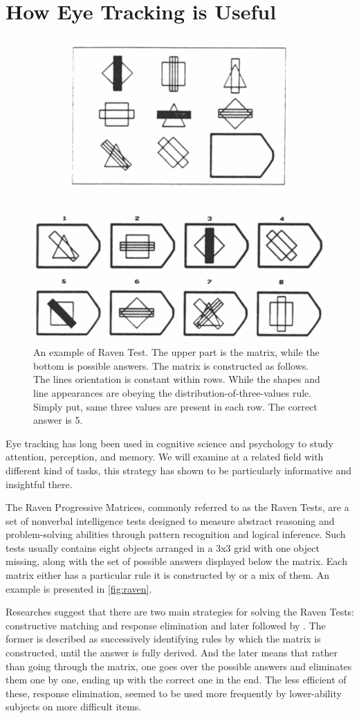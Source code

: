 \section{How Eye Tracking is Useful}
\begin{figure}
    \centering
    \includegraphics[width=0.5\linewidth]{images/raven_carpenter_1990.png}
    \caption{An example of Raven Test. The upper part is the matrix, while the bottom is possible answers. The matrix is constructed as follows. The lines orientation is constant within rows. While the shapes and line appearances are obeying the distribution-of-three-values rule. Simply put, same three values are present in each row. The correct answer is 5.}
    \label{fig:raven}
\end{figure}
Eye tracking has long been used in cognitive science and psychology to study attention, perception, and memory. We will examine at a related field with different kind of tasks, this strategy has shown to be particularly informative and insightful there. 

The Raven Progressive Matrices, commonly referred to as the Raven Tests, are a set of nonverbal intelligence tests designed to measure abstract reasoning and problem-solving abilities through pattern recognition and logical inference. Such tests usually contains eight objects arranged in a 3x3 grid with one object missing, along with the set of possible answers displayed below the matrix. Each matrix either has a particular rule it is constructed by or a mix of them. An example is presented in \autoref{fig:raven}. 

Researches suggest that there are two main strategies for solving the Raven Tests: constructive matching and response elimination \citep{Bethel-Fox_1984} and later followed by \cite{Vigneau_2006}. The former is described as successively identifying rules by which the matrix is constructed, until the answer is fully derived. And the later means that rather than going through the matrix, one goes over the possible answers and eliminates them one by one, ending up with the correct one in the end. The less efficient of these, response elimination, seemed to be used more frequently by lower-ability subjects on more difficult items. 

